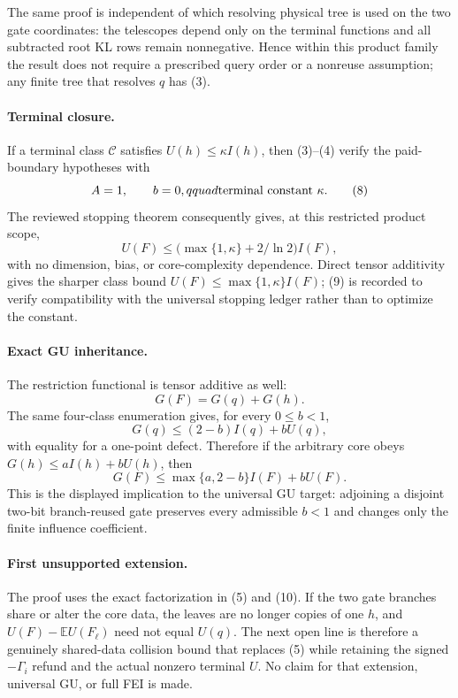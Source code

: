 The same proof is independent of which resolving physical tree is used on
the two gate coordinates: the telescopes depend only on the terminal
functions and all subtracted root KL rows remain nonnegative.  Hence within
this product family the result does not require a prescribed query order or
a nonreuse assumption; any finite tree that resolves \(q\) has (3).

\paragraph{Terminal closure.}
If a terminal class \(\mathcal C\) satisfies \(U(h)\le\kappa I(h)\), then
(3)--(4) verify the paid-boundary hypotheses with
\[
 A=1,\qquad b=0,qquad\hbox{terminal constant }\kappa.                 \tag{8}
\]
The reviewed stopping theorem consequently gives, at this restricted
product scope,
\[
 U(F)\le\bigl(\max\{1,\kappa\}+2/\ln2\bigr)I(F),                      \tag{9}
\]
with no dimension, bias, or core-complexity dependence.  Direct tensor
additivity gives the sharper class bound
\(U(F)\le\max\{1,\kappa\}I(F)\); (9) is recorded to verify compatibility
with the universal stopping ledger rather than to optimize the constant.

\paragraph{Exact GU inheritance.}
The restriction functional is tensor additive as well:
\[
 G(F)=G(q)+G(h).                                                        \tag{10}
\]
The same four-class enumeration gives, for every \(0\le b<1\),
\[
 G(q)\le(2-b)I(q)+bU(q),                                               \tag{11}
\]
with equality for a one-point defect.  Therefore if the arbitrary core
obeys \(G(h)\le aI(h)+bU(h)\), then
\[
 \boxed{G(F)\le\max\{a,2-b\}I(F)+bU(F).}                              \tag{12}
\]
This is the displayed implication to the universal GU target: adjoining a
disjoint two-bit branch-reused gate preserves every admissible \(b<1\) and
changes only the finite influence coefficient.

\paragraph{First unsupported extension.}
The proof uses the exact factorization in (5) and (10).  If the two gate
branches share or alter the core data, the leaves are no longer copies of
one \(h\), and \(U(F)-\mathbb E U(F_\ell)\) need not equal \(U(q)\).
The next open line is therefore a genuinely shared-data collision bound
that replaces (5) while retaining the signed \(-\Gamma_i\) refund and the
actual nonzero terminal \(U\).  No claim for that extension, universal GU,
or full FEI is made.
